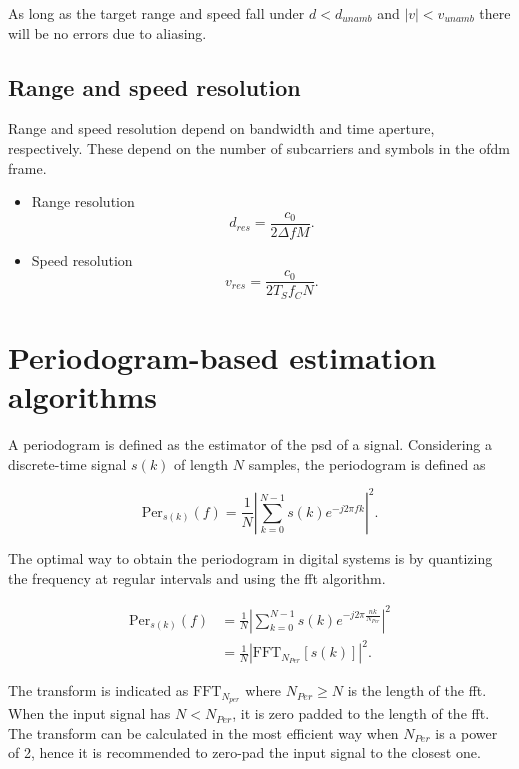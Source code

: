         As long as the target range and speed fall under $d < d_{unamb}$ and $|v| < v_{unamb}$ there will be no errors due to aliasing.
        
    \subsection{Range and speed resolution}
    
        Range and speed resolution depend on bandwidth and time aperture, respectively. These depend on the number of subcarriers and symbols in the \gls{ofdm} frame.
        
        \begin{itemize}
            \item Range resolution
            $$ d_{res} =  \frac{c_0}{2\Delta f M}. $$
            \item Speed resolution
            $$ v_{res} = \frac{c_0}{2 T_S f_C N}. $$
        \end{itemize}
        

        
\section{Periodogram-based estimation algorithms}
    
    A periodogram is defined as the estimator of the \gls{psd} of a signal.
    Considering a discrete-time signal $s(k)$ of length $N$ samples, the periodogram is defined as
    
    \begin{equation*}
        \text{Per}_{s(k)}(f) = \frac{1}{N}\left| \sum_{k=0}^{N-1} s(k)e^{-j2\pi fk}\right|^2.
    \end{equation*}

    The optimal way to obtain the periodogram in digital systems is by quantizing the frequency at regular intervals and using the \gls{fft} algorithm.

    \begin{align*}
        \text{Per}_{s(k)}(f) &= \frac{1}{N}\left| \sum_{k=0}^{N-1} s(k)e^{-j2\pi \frac{nk}{N_{Per}}}\right|^2 \\
        &= \frac{1}{N}\left| \text{FFT}_{N_{Per}}[s(k)]\right|^2.
    \end{align*}
    
    
    The transform is indicated as $\text{FFT}_{N_{per}}$ where $N_{Per} \geq N$ is the length of the \gls{fft}. When the input signal has $N < N_{Per}$, it is zero padded to the length of the \gls{fft}.
    The transform can be calculated in the most efficient way when $N_{Per}$ is a power of 2, hence it is recommended to zero-pad the input signal to the closest one.

